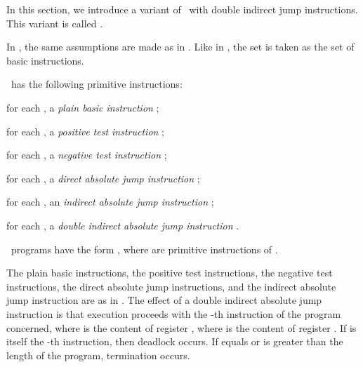 \documentclass[fleqn]{llncs}
\begin{document}
In this section, we introduce a variant of \PGLDij\ with double indirect
jump instructions.
This variant is called \PGLDdij.

In \PGLDdij, the same assumptions are made as in \PGLDij.
Like in \PGLDij, the set  is
taken as the set  of basic instructions.

\PGLDdij\ has the following primitive instructions:
\begin{iteml}
\item
for each , a \emph{plain basic instruction} ;
\item
for each , a \emph{positive test instruction} ;
\item
for each , a \emph{negative test instruction} ;
\item
for each , a \emph{direct absolute jump instruction}
;
\item
for each , an \emph{indirect absolute jump instruction}
;
\item
for each ,
a \emph{double indirect absolute jump instruction} .
\end{iteml}
\PGLDdij\ programs have the form , where
 are primitive instructions of \PGLDdij.

The plain basic instructions, the positive test instructions, the
negative test instructions, the direct absolute jump instructions, and
the indirect absolute jump instruction are as in \PGLDij.
The effect of a double indirect absolute jump instruction 
is that execution proceeds with the -th instruction of the program
concerned, where  is the content of register , where 
is the content of register .
If  is itself the -th instruction, then deadlock occurs.
If  equals  or  is greater than the length of the program,
termination occurs.
\end{document}
